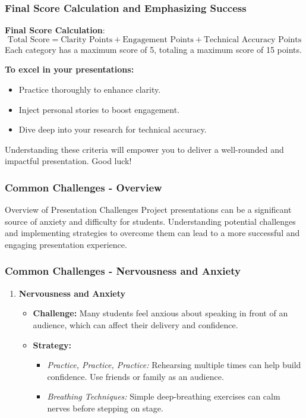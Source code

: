 \documentclass[aspectratio=169]{beamer}
\begin{document}
\begin{frame}[fragile]
    \frametitle{Final Score Calculation and Emphasizing Success}
    \textbf{Final Score Calculation}:
    \begin{equation}
        \text{Total Score} = \text{Clarity Points} + \text{Engagement Points} + \text{Technical Accuracy Points}
    \end{equation}
    Each category has a maximum score of 5, totaling a maximum score of 15 points.

    \textbf{To excel in your presentations:}
    \begin{itemize}
        \item Practice thoroughly to enhance clarity.
        \item Inject personal stories to boost engagement.
        \item Dive deep into your research for technical accuracy.
    \end{itemize}
    Understanding these criteria will empower you to deliver a well-rounded and impactful presentation. Good luck!
\end{frame}

\begin{frame}[fragile]
    \frametitle{Common Challenges - Overview}
    \begin{block}{Overview of Presentation Challenges}
        Project presentations can be a significant source of anxiety and difficulty for students. 
        Understanding potential challenges and implementing strategies to overcome them can lead to a more successful and engaging presentation experience.
    \end{block}
\end{frame}

\begin{frame}[fragile]
    \frametitle{Common Challenges - Nervousness and Anxiety}
    \begin{enumerate}
        \item \textbf{Nervousness and Anxiety}
        \begin{itemize}
            \item \textbf{Challenge:} Many students feel anxious about speaking in front of an audience, which can affect their delivery and confidence.
            \item \textbf{Strategy:}
            \begin{itemize}
                \item \textit{Practice, Practice, Practice:} Rehearsing multiple times can help build confidence. Use friends or family as an audience.
                \item \textit{Breathing Techniques:} Simple deep-breathing exercises can calm nerves before stepping on stage.
            \end{itemize}
        \end{itemize}
    \end{enumerate}
\end{frame}
\end{document}
